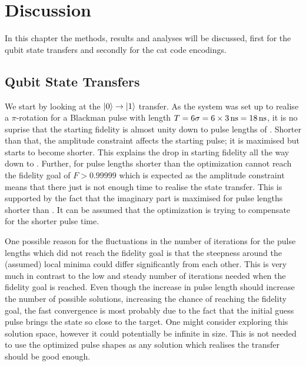\documentclass[main.tex]{subfiles}
\begin{document}
\chapter{Discussion}
In this chapter the methods, results and analyses will be discussed, first for the qubit state transfers and secondly for the cat code encodings.

\section{Qubit State Transfers}
We start by looking at the \(\ket{0}\rightarrow\ket{1}\) transfer.
As the system was set up to realise a \(\pi\)-rotation for a Blackman pulse with length \(T=6\sigma = 6\times\SI{3}{\nano\second} = \SI{18}{\nano\second}\), it is no suprise that the starting fidelity is almost unity down to pulse lengths of .
Shorter than that, the amplitude constraint affects the starting pulse; it is maximised but starts to become shorter.
This explains the drop in starting fidelity all the way down to .
Further, for pulse lengths shorter than  the optimization cannot reach the fidelity goal of \(F > 0.99999\) which is expected as the amplitude constraint means that there just is not enough time to realise the state transfer.
This is supported by the fact that the imaginary part is maximised for pulse lengths shorter than .
It can be assumed that the optimization is trying to compensate for the shorter pulse time.

One possible reason for the fluctuations in the number of iterations for the pulse lengths which did not reach the fidelity goal is that the steepness around the (assumed) local minima could differ significantly from each other.
This is very much in contrast to the low and steady number of iterations needed when the fidelity goal is reached.
Even though the increase in pulse length should increase the number of possible solutions, increasing the chance of reaching the fidelity goal, the fast convergence is most probably due to the fact that the initial guess pulse brings the state so close to the target.
One might consider exploring this solution space, however it could potentially be infinite in size.
This is not needed to use the optimized pulse shapes as any solution which realises the transfer should be good enough.
\end{document}
